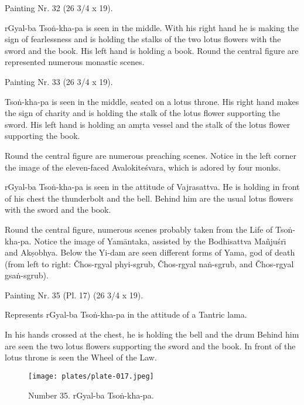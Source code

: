 \documentclass[a4paper, 12pt, oneside]{article}
\begin{document}
\bigskip

Painting Nr. 32 (26 3/4 x 19).

\bigskip

rGyal-ba Tso\.{n}-kha-pa is seen in the middle. With his right hand he is making the sign of fearlessness and is holding the stalks of the two lotus flowers with the sword and the book. His left hand is holding a book. Round the central figure are represented numerous monastic scenes.

\bigskip

Painting Nr. 33 (26 3/4 x 19).

\bigskip

Tso\.{n}-kha-pa is seen in the middle, seated on a lotus throne. His right hand makes the sign of charity and is holding the stalk of the lotus flower supporting the sword. His left hand is holding an am\d{r}ta vessel and the stalk of the lotus flower supporting the book.

Round the central figure are numerous preaching scenes. Notice in the left corner the image of the eleven-faced Avalokite\'{s}vara, which is adored by four monks.

rGyal-ba Tso\.{n}-kha-pa is seen in the attitude of Vajrasattva. He is holding in front of his chest the thunderbolt and the bell. Behind him are the usual lotus flowers with the sword and the book.

Round the central figure, numerous scenes probably taken from the Life of Tso\.{n}-kha-pa. Notice the image of Yam\={a}ntaka, assisted by the Bodhisattva Ma\~{n}ju\'{s}r\={\i} and Ak\d{s}obhya. Below the Yi-dam are seen different forms of Yama, god of death (from left to right: Čhos-rgyal phyi-sgrub, Čhos-rgyal na\.{n}-sgrub, and Čhos-rgyal gsa\.{n}-sgrub).

\bigskip

Painting Nr. 35 (Pl. 17) (26 3/4 x 19).

\bigskip

Represents rGyal-ba Tso\.{n}-kha-pa in the attitude of a Tantric lama.

In his hands crossed at the chest, he is holding the bell and the drum Behind him are seen the two lotus flowers supporting the sword and the book. In front of the lotus throne is seen the Wheel of the Law.

\clearpage
\begin{figure}[H]
\centering
\texttt{[image: plates/plate-017.jpeg]}
\caption*{Number 35. rGyal-ba Tso\.{n}-kha-pa.}
\end{figure}
\clearpage
\end{document}

